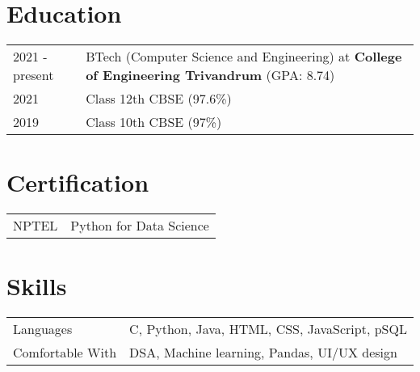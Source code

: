 \documentclass[a4paper,12pt]{article}
\begin{document}
\section{Education}
\begin{tabularx}{\linewidth}{@{}l X@{}}	
2021 - present & BTech (Computer Science and Engineering) at \textbf{College of Engineering Trivandrum} \hfill \normalsize (GPA: 8.74) \\

2021 & Class 12th CBSE \hfill  (97.6\%) \\ 

2019 & Class 10th CBSE \hfill  (97\%) \\


\end{tabularx}

\section{Certification}
\begin{tabularx}{\linewidth}{@{}l X@{}}
NPTEL & \normalsize{Python for Data Science} \\
\end{tabularx}

\section{Skills}
\begin{tabularx}{\linewidth}{@{}l X@{}}
Languages &  \normalsize{C, Python, Java, HTML, CSS, JavaScript, pSQL}\\
Comfortable With  &  \normalsize{DSA, Machine learning, Pandas, UI/UX design}\\  
\end{tabularx}

\end{document}
